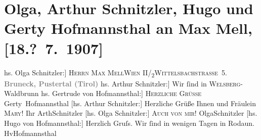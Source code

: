 

         
         \renewcommand{\erwaehntePersonen}{Personen: Hugo von Hofmannsthal, Gertrude von Hofmannsthal, Max Mell, Maria Mell, Olga Schnitzler}
         \renewcommand{\erwaehnteOrte}{Orte: Bruneck, II., Leopoldstadt, Rodaun, Wien, Wildbad Waldbrunn, Wittelsbachstraße}
         \renewcommand{\erwaehnteWerke}{}
               \section[Olga, Arthur Schnitzler, Hugo und Gerty Hofmannsthal an Max Mell, {[}18.? 7. 1907{]}]{ Olga, Arthur Schnitzler, Hugo und Gerty Hofmannsthal an Max Mell,
               {[}18.? 7. 1907{]}}\nopagebreak{}\rehead{ }\begin{ledgroupsized}[t]{13cm}\normalsize\beginnumbering \toendnotes[C]{\smallbreak\pagebreak[2]} 
\pstart{}{\pb}{[}hs. Olga Schnitzler:{]} \textsc{Herrn Max Mell}\pend{}\pstart{}\textsc{Wien II/\textsubscript{2}}\pend{}\pstart{}\textsc{Wittelsbachstrasse 5}.\pend{}{\bigskip}\pstart
           \noindent{}\centering{}\textcolor{gray}{\textbf{{\pb}Bruneck, Pustertal (Tirol)}}\pend
           \pstart
           \centering{}{[}hs. Arthur Schnitzler:{]} Wir ſind in \textsc{Welsberg}-Waldbrunn\pend
           \pstart
           \noindent{}{\pb}{[}hs. Gertrude von Hofmannsthal:{]} \textsc{Herzliche Grüsse}{ }\spacefill\mbox{Gerty Hofmannsthal}\pend
           \pstart
           {[}hs. Arthur Schnitzler:{]} Herzliche Grüße Ihnen und Fräulein \textsc{Mary}! Ihr{ }\spacefill\mbox{ArthSchnitzler}\pend
           \pstart
           {[}hs. Olga Schnitzler:{]} \textsc{Auch von mir!}{ }\spacefill\mbox{OlgaSchnitzler}\pend
           \pstart
           {[}hs. Hugo von Hofmannsthal:{]} Herzlich Gruſs. Wir ſind in wenigen Tagen in Rodaun.{ }\spacefill\mbox{HvHofmannsthal}\pend
           
         
         \endnumbering{}\end{ledgroupsized}  \newcommand{\dateiname}{L01693}\newcommand{\titel}{Olga, Arthur Schnitzler, Hugo und Gerty Hofmannsthal an Max Mell, [18.? 7. 1907]}\newcommand{\editorInnen}{Martin Anton Müller und Gerd-Hermann Susen}
      
